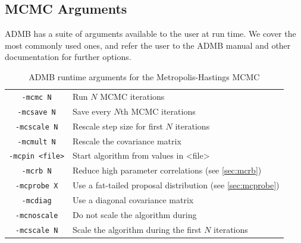 \documentclass{article}\usepackage[]{graphicx}\usepackage[]{color}
\begin{document}
\subsection{MCMC Arguments}
ADMB has a suite of arguments available to the user at run
time. We cover the most commonly used ones, and refer the
user to the ADMB manual and other documentation for further
options.
\begin{table}[h]
  \centering
  \begin{tabular}[h]{|cl|}
    \hline
    \texttt{-mcmc N} & Run $N$ MCMC iterations\\
    \texttt{-mcsave N} & Save every $N$th MCMC iterations\\
    \texttt{-mcscale N} & Rescale step size for first $N$ iterations\\
    \texttt{-mcmult N} & Rescale the covariance matrix\\
    \texttt{-mcpin <file>} & Start algorithm from values in <file>\\
    \texttt{-mcrb N} & Reduce high parameter correlations
    (see \ref{sec:mcrb})\\
    \texttt{-mcprobe X} & Use a fat-tailed proposal
    distribution (see \ref{sec:mcprobe})\\
    \texttt{-mcdiag} & Use a diagonal covariance matrix\\
    \texttt{-mcnoscale} & Do not scale the algorithm during\\
    \texttt{-mcscale N} & Scale the algorithm during the
    first $N$ iterations\\
    \hline
  \end{tabular}
  \caption{ADMB runtime arguments for the Metropolis-Hastings MCMC}
  \label{tab:mh_args}
\end{table}
\end{document}
